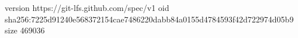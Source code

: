 version https://git-lfs.github.com/spec/v1
oid sha256:7225d91240e568372154cae7486220dabb84a0155d4784593f42d722974d05b9
size 469036
